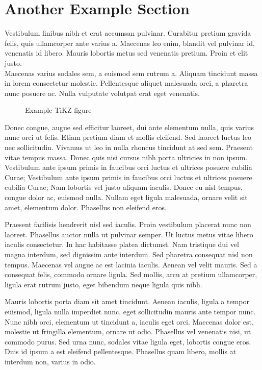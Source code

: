\section{Another Example Section}
\label{sec:tikz}

Vestibulum finibus nibh et erat accumsan pulvinar.
Curabitur pretium gravida felis, quis ullamcorper ante varius a.
Maecenas leo enim, blandit vel pulvinar id, venenatis id libero.
Mauris lobortis metus sed venenatis pretium.
Proin et elit justo. \\
Maecenas varius sodales sem, a euismod sem rutrum a.
Aliquam tincidunt massa in lorem consectetur molestie.
Pellentesque aliquet malesuada orci, a pharetra nunc posuere ac.
Nulla vulputate volutpat erat eget venenatis.

\begin{figure}[htbp]
  \centering
  
  \caption{Example TiKZ figure}
  \label{fig:tikz}
\end{figure}

Donec congue, augue sed efficitur laoreet, dui ante elementum nulla, quis varius nunc orci ut felis.
Etiam pretium diam et mollis eleifend.
Sed laoreet luctus leo nec sollicitudin.
Vivamus ut leo in nulla rhoncus tincidunt at sed sem.
Praesent vitae tempus massa.
Donec quis nisi cursus nibh porta ultricies in non ipsum.
Vestibulum ante ipsum primis in faucibus orci luctus et ultrices posuere cubilia Curae; Vestibulum ante ipsum primis in faucibus orci luctus et ultrices posuere cubilia Curae; Nam lobortis vel justo aliquam iaculis.
Donec eu nisl tempus, congue dolor ac, euismod nulla.
Nullam eget ligula malesuada, ornare velit sit amet, elementum dolor.
Phasellus non eleifend eros.


Praesent facilisis hendrerit nisl sed iaculis.
Proin vestibulum placerat nunc non laoreet.
Phasellus auctor nulla ut pulvinar semper.
Ut luctus metus vitae libero iaculis consectetur.
In hac habitasse platea dictumst.
Nam tristique dui vel magna interdum, sed dignissim ante interdum.
Sed pharetra consequat nisl non tempus.
Maecenas vel augue ac est lacinia iaculis.
Aenean vel velit mauris.
Sed a consequat felis, commodo ornare ligula.
Sed mollis, arcu at pretium ullamcorper, ligula erat rutrum justo, eget bibendum neque ligula quis nibh.


Mauris lobortis porta diam sit amet tincidunt.
Aenean iaculis, ligula a tempor euismod, ligula nulla imperdiet nunc, eget sollicitudin mauris ante tempor nunc.
Nunc nibh orci, elementum ut tincidunt a, iaculis eget orci.
Maecenas dolor est, molestie ut fringilla elementum, ornare ut odio.
Phasellus vel venenatis nisi, ut commodo purus.
Sed urna nunc, sodales vitae ligula eget, lobortis congue eros.
Duis id ipsum a est eleifend pellentesque.
Phasellus quam libero, mollis at interdum non, varius in odio.

